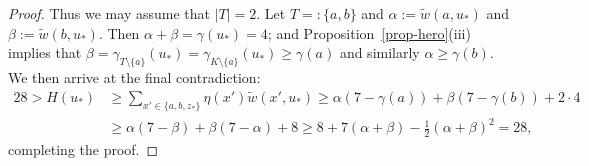 \documentclass[10pt,a4paper]{amsart}
\begin{document}
\begin{proof}
	Thus we may assume that $|T| = 2$.
	Let $T =: \lbrace a,b\rbrace$ and $\alpha := \tilde{w}(a,u_*)$ and $\beta := \tilde{w}(b,u_*)$.
	Then $\alpha+\beta=\gamma(u_*)=4$; and Proposition~\ref{prop-hero}(iii) implies that 
	$\beta = \gamma_{T\setminus\{a\}}(u_*) = \gamma_{K\setminus\{a\}}(u_*) \geq \gamma(a)$
	and similarly $\alpha \geq \gamma(b)$. We then arrive at the final contradiction:
	\begin{align*}
		28>H(u_*) &\geq \sum_{x' \in \{a,b,z_*\}}\eta(x')\tilde{w}(x',u_*) \ge \alpha(7-\gamma(a)) + \beta(7-\gamma(b)) + 2\cdot 4\\ &\ge \alpha(7-\beta) + \beta(7-\alpha) + 8\ge  8 + 7(\alpha+\beta)-\frac{1}{2}(\alpha+\beta)^2=28,
	\end{align*}
	completing the proof.
\end{proof}
\end{document}
